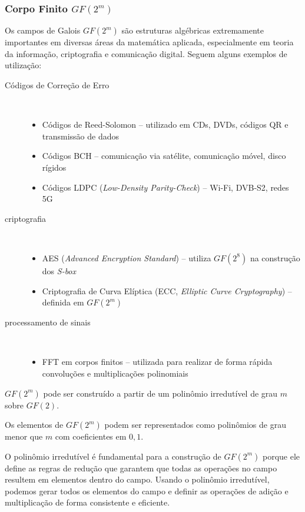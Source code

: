 \begin{frame}[allowframebreaks]
  \frametitle{Corpo Finito $GF(2^m)$}
  Os campos de Galois $GF(2^m)$ são estruturas algébricas extremamente importantes em diversas áreas da matemática aplicada, especialmente em teoria da informação, criptografia e comunicação digital.
  Seguem alguns exemplos de utilização:
  \begin{description}
    \item[Códigos de Correção de Erro]\hfill \\
      \begin{itemize}
        \item Códigos de Reed-Solomon -- utilizado em CDs, DVDs, códigos QR e transmissão de dados
        \item Códigos BCH -- comunicação via satélite, comunicação móvel, disco rígidos
        \item Códigos LDPC (\emph{Low-Density Parity-Check}) -- Wi-Fi, DVB-S2, redes 5G
      \end{itemize}
    \framebreak
    \item[criptografia]\hfill \\
      \begin{itemize}
        \item AES (\emph{Advanced Encryption Standard}) -- utiliza $GF(2^8)$ na construção dos \emph{S-box}
        \item Criptografia de Curva Elíptica (ECC, \emph{Elliptic Curve Cryptography}) -- definida em $GF(2^m)$
      \end{itemize}
    \item[processamento de sinais]\hfill \\
      \begin{itemize}
        \item FFT em corpos finitos -- utilizada para realizar de forma rápida convoluções e multiplicações polinomiais
        \end{itemize}
  \end{description}

  \framebreak
  $GF(2^m)$ pode ser construído a partir de um polinômio irredutível de grau $m$ sobre $GF(2)$.

  \vspace{2ex}
  Os elementos de $GF(2^m)$ podem ser representados como polinômios de grau menor que $m$ com coeficientes em ${0,1}$.

  \vspace{2ex}
  O polinômio irredutível é fundamental para a construção de $GF(2^m)$ porque
  ele define as regras de redução que garantem que todas as operações no campo
  resultem em elementos dentro do campo. Usando o polinômio irredutível,
  podemos gerar todos os elementos do campo e definir as operações de adição e
  multiplicação de forma consistente e eficiente.
\end{frame}

